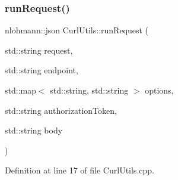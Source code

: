 \subsubsection{\texorpdfstring{run\+Request()}{runRequest()}}
{\footnotesize\ttfamily nlohmann\+::json Curl\+Utils\+::run\+Request (\begin{DoxyParamCaption}\item[{std\+::string}]{request,  }\item[{std\+::string}]{endpoint,  }\item[{std\+::map$<$ std\+::string, std\+::string $>$}]{options,  }\item[{std\+::string}]{authorization\+Token,  }\item[{std\+::string}]{body }\end{DoxyParamCaption})}



Definition at line 17 of file Curl\+Utils.\+cpp.

